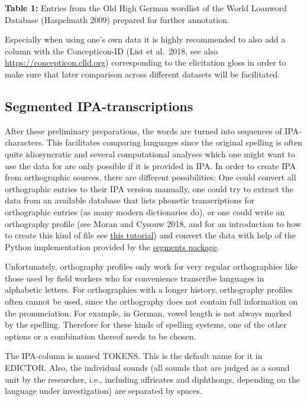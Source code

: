 \documentclass[
  english,
  a4paper,
  oneside,tablecaptionabove
]{scrbook}
\begin{document}
\textbf{Table 1:} Entries from the Old High German wordlist of the World
Loanword Database (Haspelmath 2009) prepared for further annotation.

Especially when using one's own data it is highly recommended to also
add a column with the Concepticon-ID (List et al.~2018, see also
\url{https://concepticon.clld.org}) corresponding to the elicitation
gloss in order to make sure that later comparison across different
datasets will be facilitated.

\hypertarget{segmented-ipa-transcriptions}{%
\subsection{Segmented
IPA-transcriptions}\label{segmented-ipa-transcriptions}}

After these preliminary preparations, the words are turned into
sequences of IPA-characters. This facilitates comparing languages since
the original spelling is often quite idiosyncratic and several
computational analyses which one might want to use the data for are only
possible if it is provided in IPA. In order to create IPA from
orthographic sources, there are different possibilities: One could
convert all orthographic entries to their IPA version manually, one
could try to extract the data from an available database that lists
phonetic transcriptions for orthographic entries (as many modern
dictionaries do), or one could write an orthography profile (see Moran
and Cysouw 2018, and for an introduction to how to create this kind of
file see
\href{http://htmlpreview.github.io/?https://raw.githubusercontent.com/digling/calc-seminar/master/handouts/Session_6.html}{this
tutorial}) and convert the data with help of the Python implementation
provided by the \href{https://github.com/cldf/segments}{segments
package}.

Unfortunately, orthography profiles only work for very regular
orthographies like those used by field workers who for convenience
transcribe languages in alphabetic letters. For orthographies with a
longer history, orthography profiles often cannot be used, since the
orthography does not contain full information on the pronunciation. For
example, in German, vowel length is not always marked by the spelling.
Therefore for these kinds of spelling systems, one of the other options
or a combination thereof needs to be chosen.

The IPA-column is named TOKENS. This is the default name for it in
EDICTOR. Also, the individual sounds (all sounds that are judged as a
sound unit by the researcher, i.e., including affricates and diphthongs,
depending on the language under investigation) are separated by spaces.
\end{document}
